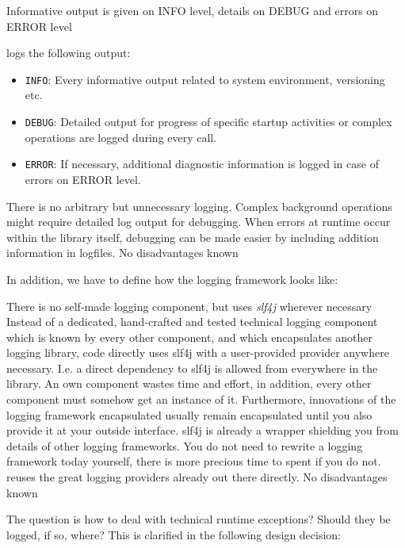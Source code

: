 {%
Informative output is given on INFO level, details on DEBUG and errors on ERROR level
}
{%
\LibName{} logs the following output:
\begin{itemize}
\item \texttt{INFO}: Every informative output related to system environment, versioning etc.
\item \texttt{DEBUG}: Detailed output for progress of specific startup activities or complex operations are logged during every call.
\item \texttt{ERROR}: If necessary, additional diagnostic information is logged in case of errors on ERROR level.
\end{itemize}
}
{%
There is no arbitrary but unnecessary logging. Complex background operations might require detailed log output for debugging. When errors at runtime occur within the library itself, debugging can be made easier by including addition information in logfiles.
}
{%
No disadvantages known
}

In addition, we have to define how the logging framework looks like:

{%
There is no self-made logging component, but \LibName{} uses \emph{slf4j} wherever necessary
}
{%
Instead of a dedicated, hand-crafted and tested technical logging component which is known by every other component, and which encapsulates another logging library, \LibName{} code directly uses slf4j with a user-provided provider anywhere necessary. I.e. a direct dependency to slf4j is allowed from everywhere in the library.
}
{%
An own component wastes time and effort, in addition, every other component must somehow get an instance of it. Furthermore, innovations of the logging framework encapsulated usually remain encapsulated until you also provide it at your outside interface. slf4j is already a wrapper shielding you from details of other logging frameworks. You do not need to rewrite a logging framework today yourself, there is more precious time to spent if you do not. \LibName{} reuses the great logging providers already out there directly. 
}
{%
No disadvantages known
}

The question is how to deal with technical runtime exceptions? Should they be logged, if so, where? This is clarified in the following design decision:

